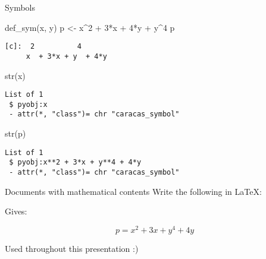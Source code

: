 \documentclass[
  ignorenonframetext,
]{beamer}
\newenvironment{Shaded}{\begin{snugshade}}{\end{snugshade}}
\newcommand{\AttributeTok}[1]{\textcolor[rgb]{0.40,0.45,0.13}{#1}}
\newcommand{\DecValTok}[1]{\textcolor[rgb]{0.68,0.00,0.00}{#1}}
\newcommand{\ErrorTok}[1]{\textcolor[rgb]{0.68,0.00,0.00}{#1}}
\newcommand{\FunctionTok}[1]{\textcolor[rgb]{0.28,0.35,0.67}{#1}}
\newcommand{\NormalTok}[1]{\textcolor[rgb]{0.00,0.23,0.31}{#1}}
\newcommand{\OtherTok}[1]{\textcolor[rgb]{0.00,0.23,0.31}{#1}}
\newcommand{\SpecialCharTok}[1]{\textcolor[rgb]{0.37,0.37,0.37}{#1}}
\newcommand{\StringTok}[1]{\textcolor[rgb]{0.13,0.47,0.30}{#1}}
\begin{document}
\begin{frame}[fragile]{Symbols}
\protect\hypertarget{symbols}{}
\begin{Shaded}
\begin{Highlighting}[]
\FunctionTok{def\_sym}\NormalTok{(x, y)}
\NormalTok{p }\OtherTok{\textless{}{-}}\NormalTok{ x}\SpecialCharTok{\^{}}\DecValTok{2} \SpecialCharTok{+} \DecValTok{3}\SpecialCharTok{*}\NormalTok{x }\SpecialCharTok{+} \DecValTok{4}\SpecialCharTok{*}\NormalTok{y }\SpecialCharTok{+}\NormalTok{ y}\SpecialCharTok{\^{}}\DecValTok{4}
\NormalTok{p}
\end{Highlighting}
\end{Shaded}

\begin{verbatim}
[c]:  2          4      
     x  + 3*x + y  + 4*y
\end{verbatim}

\begin{Shaded}
\begin{Highlighting}[]
\FunctionTok{str}\NormalTok{(x)}
\end{Highlighting}
\end{Shaded}

\begin{verbatim}
List of 1
 $ pyobj:x
 - attr(*, "class")= chr "caracas_symbol"
\end{verbatim}

\begin{Shaded}
\begin{Highlighting}[]
\FunctionTok{str}\NormalTok{(p)}
\end{Highlighting}
\end{Shaded}

\begin{verbatim}
List of 1
 $ pyobj:x**2 + 3*x + y**4 + 4*y
 - attr(*, "class")= chr "caracas_symbol"
\end{verbatim}
\end{frame}

\begin{frame}[fragile]{Documents with mathematical contents}
\protect\hypertarget{documents-with-mathematical-contents}{}
Write the following in LaTeX:

\begin{Shaded}
\end{Shaded}

Gives:

\[
p = x^{2} + 3 x + y^{4} + 4 y
\]

Used throughout this presentation :)
\end{frame}
\end{document}
